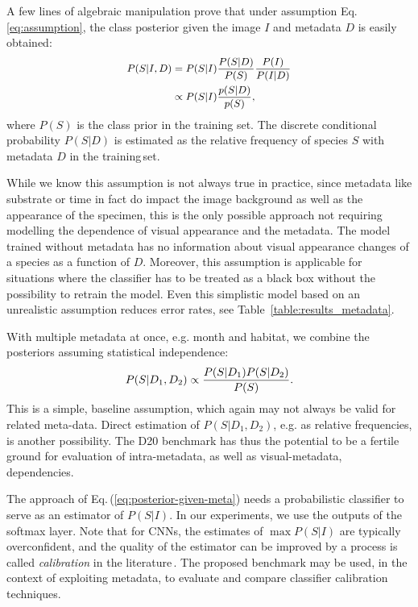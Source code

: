 \documentclass[10pt,twocolumn,letterpaper]{article}
\begin{document}
A few lines of algebraic manipulation prove that under assumption Eq.\,\eqref{eq:assumption}, the class posterior given the image $I$ and metadata $D$ is easily obtained:
\begin{equation}
\small
\begin{aligned}
  P(S|I,D)  & =       P(S|I) \frac{P(S|D)}{P(S)}\frac{P(I)}{P(I|D)} \\
            & \propto P(S|I) \frac{p(S|D)}{p(S)},
\label{eq:posterior-given-meta}
\end{aligned}
\end{equation}
where $P(S)$ is the class prior in the training set.
The discrete conditional probability $P(S|D)$ is estimated as the relative frequency of species $S$ with metadata $D$ in the training\,set.


While we know this assumption is not always true in practice, since metadata like substrate or time in fact do impact the image background as well as the appearance of the specimen, 
this is the only possible approach not requiring modelling the dependence of visual appearance and the metadata. 
The model trained without metadata has no information about visual appearance changes of a species as a function of $D$. Moreover, this assumption is applicable for situations where the classifier has to be treated as a black box without the possibility to retrain the model.
Even this simplistic model based on an unrealistic assumption reduces error rates, see
Table~\ref{table:results_metadata}.


With multiple metadata at once, e.g. month and habitat, we combine the posteriors assuming statistical independence:
\begin{equation}
\small
    P (S | D_1,D_2) \propto \frac{P (S | D_1 ) P(S|D_2)}{P(S)}.
\end{equation}
This is a simple, baseline assumption, which again may not always be valid for related meta-data. Direct estimation of $P(S | D_1,D_2)$, e.g. as relative frequencies, is another possibility. The D20 benchmark has thus the potential to be a fertile ground for evaluation of intra-metadata, as well as visual-metadata, dependencies.

The approach of Eq.\,(\ref{eq:posterior-given-meta}) needs a probabilistic classifier to serve as an estimator of $P(S|I)$. In our experiments, we use the outputs of the softmax layer.
Note that for CNNs, the estimates of $\max P(S|I)$ are typically overconfident, and the quality of the estimator can be improved by a process is called {\it calibration} in the literature\,\cite{guo2017calibration,vaicenavicius2019evaluating}. 
The proposed benchmark may be used, in the context of exploiting metadata, to evaluate and compare classifier calibration techniques.
\end{document}
